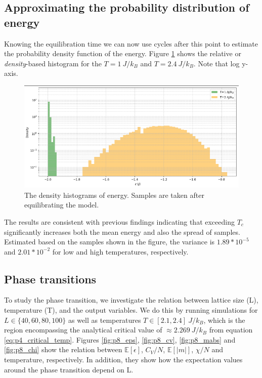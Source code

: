 \documentclass[../main_proj4_correct_template.tex]{subfiles}
\begin{document}
\subsection{Approximating the probability distribution of energy}

Knowing the equilibration time we can now use cycles after this point to estimate the probability density function of the energy. Figure \ref{fig:p4_p6pdf} shows the relative or \textit{density}-based histogram for the $T=1~J/k_B$ and $T=2.4~J/k_B$. Note that log y-axis.

\begin{figure}[h!]
    \centering
    \includegraphics[width=0.8\linewidth]{Project 4/figures/p6_pdfeps.png}
    \caption{The density histograms of energy. Samples are taken after equilibrating the model.}
    \label{fig:p4_p6pdf}
\end{figure}

The results are consistent with previous findings indicating that exceeding $T_c$ significantly increases both the mean energy and also the spread of samples. Estimated based on the samples shown in the figure, the variance is $1.89*10^{-5}$ and $2.01*10^{-2}$ for low and high temperatures, respectively.

\subsection{Phase transitions}

To study the phase transition, we investigate the relation between lattice size (L), temperature (T), and the output variables. We do this by running simulations for $L\in\{40,60,80,100\}$ as well as temperatures $T\in[2.1, 2.4]~J/k_B$, which is the region encompassing the analytical critical value of $\approx 2.269~J/k_B$ from equation \eqref{eq:p4_critical_temp}. Figures \ref{fig:p8_eps}, \ref{fig:p8_cv}, \ref{fig:p8_mabs} and \ref{fig:p8_chi} show the relation between $\mathbb{E}[\epsilon]$, $C_V/N$, $\mathbb{E}[|m|]$, $\chi/N$ and temperature, respectively. In addition, they show how the expectation values around the phase transition depend on L.
\end{document}
